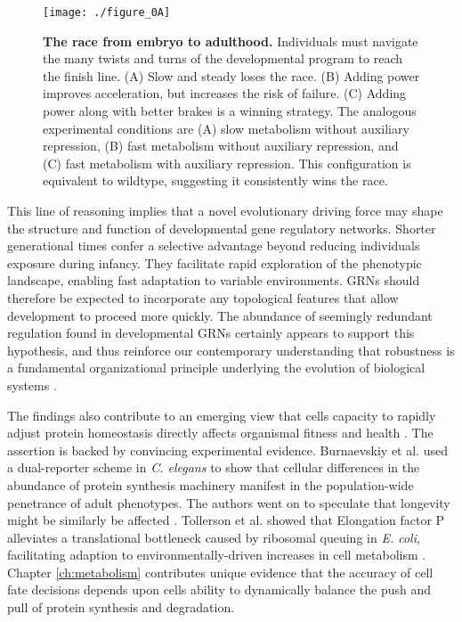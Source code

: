 \begin{figure}[h!]
\centering
\texttt{[image: ./figure\_0A]}
\caption[The race from embryo to adulthood.]{\textbf{The race from embryo to adulthood.} Individuals must navigate the many twists and turns of the developmental program to reach the finish line. (A) Slow and steady loses the race. (B) Adding power improves acceleration, but increases the risk of failure. (C) Adding power along with better brakes is a winning strategy. The analogous experimental conditions are (A) slow metabolism without auxiliary repression, (B) fast metabolism without auxiliary repression, and (C) fast metabolism with auxiliary repression. This configuration is equivalent to wildtype, suggesting it consistently wins the race.}
\label{fig:conc:fig0}
\end{figure}

This line of reasoning implies that a novel evolutionary driving force may shape the structure and function of developmental gene regulatory networks. Shorter generational times confer a selective advantage beyond reducing individuals exposure during infancy. They facilitate rapid exploration of the phenotypic landscape, enabling fast adaptation to variable environments. GRNs should therefore be expected to incorporate any topological features that allow development to proceed more quickly. The abundance of seemingly redundant regulation found in developmental GRNs certainly appears to support this hypothesis, and thus reinforce our contemporary understanding that robustness is a fundamental organizational principle underlying the evolution of biological systems \cite{Kitano2004,Stelling2004}. 

The findings also contribute to an emerging view that cells capacity to rapidly adjust protein homeostasis directly affects organismal fitness and health \cite{Visscher2016,Tollerson2018,Burnaevskiy2018}. The assertion is backed by convincing experimental evidence. Burnaevskiy et al. used a dual-reporter scheme in \textit{C. elegans} to show that cellular differences in the abundance of protein synthesis machinery manifest in the population-wide penetrance of adult phenotypes. The authors went on to speculate that longevity might be similarly be affected \cite{Burnaevskiy2018}. Tollerson et al. showed that Elongation factor P alleviates a translational bottleneck caused by ribosomal queuing in \textit{E. coli}, facilitating adaption to environmentally-driven increases in cell metabolism \cite{Tollerson2018}. Chapter \ref{ch:metabolism} contributes unique evidence that the accuracy of cell fate decisions depends upon cells ability to dynamically balance the push and pull of protein synthesis and degradation. 

